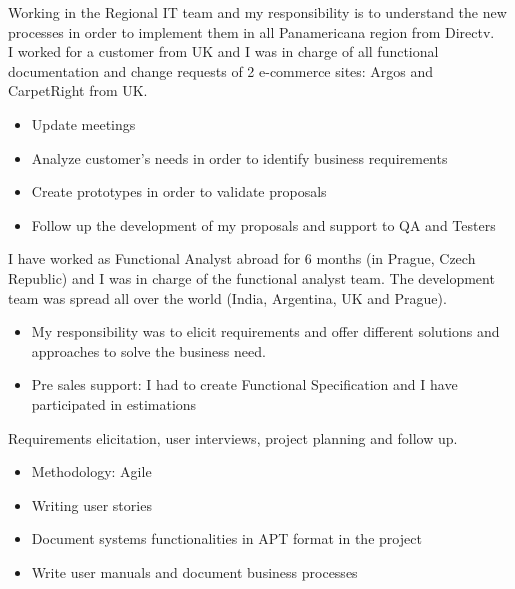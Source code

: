 \documentclass[11pt,a4paper,sans]{moderncv}
\begin{document}
Working in the Regional IT team and my responsibility is to understand the new processes in order to implement them in all Panamericana region from Directv.
\\

I worked for a customer from UK and I was in charge of all functional documentation and change requests of 2 e-commerce sites: Argos and CarpetRight from UK.


\begin{itemize}
  \item Update meetings
  \item Analyze customer’s needs in order to identify business requirements
  \item Create prototypes in order to validate proposals
  \item Follow up the development of my proposals and support to QA and Testers
\newline
\newline
\end{itemize}

I have worked as Functional Analyst abroad for 6 months (in Prague, Czech Republic) and I was in charge of the functional analyst team.
The development team was spread all over the world (India, Argentina, UK and Prague).

\begin{itemize}
  \item My responsibility was to elicit requirements and offer different solutions and approaches to solve the business need.
  \item Pre sales support: I had to create Functional Specification and I have participated in estimations
\newline
\newline
\end{itemize}

Requirements elicitation, user interviews, project planning and follow up.

\begin{itemize}
  \item Methodology: Agile
  \item Writing user stories
  \item Document systems functionalities in APT format in the project
  \item Write user manuals and document business processes
\newline
\newline
\end{itemize}
\end{document}
